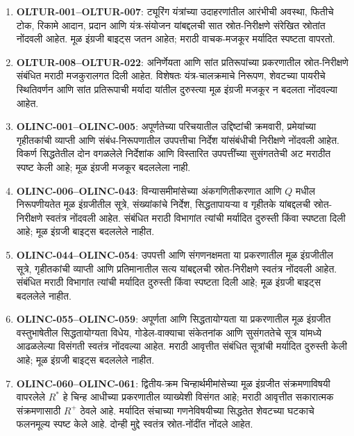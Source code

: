 \begin{enumerate}
\item \textbf{OLTUR-001--OLTUR-007}: ट्यूरिंग यंत्रांच्या उदाहरणांतील
आरंभीची अवस्था, फितीचे टोक, रिकामे आदान, प्रदान आणि यंत्र-संयोजन
यांबद्दलची सात स्रोत-निरीक्षणे संरेखित स्रोतांत नोंदवली आहेत. मूळ
इंग्रजी बाइट्स जतन आहेत; मराठी वाचक-मजकूर मर्यादित स्पष्टता वापरतो.

\item \textbf{OLTUR-008--OLTUR-022}: अनिर्णेयता आणि सांत प्रतिरूपांच्या
प्रकरणातील स्रोत-निरीक्षणे संबंधित मराठी मजकुरालगत दिली आहेत. विशेषतः
यंत्र-चालक्रमाचे निरूपण, शेवटच्या पायरीचे स्थितिवर्णन आणि सांत प्रतिरूपाची
मर्यादा यांतील दुरुस्त्या मूळ इंग्रजी मजकूर न बदलता नोंदवल्या आहेत.

\item \textbf{OLINC-001--OLINC-005}: अपूर्णतेच्या परिचयातील उद्दिष्टांची
क्रमवारी, प्रमेयांच्या गृहीतकांची व्याप्ती आणि संबंध-निरूपणातील उपपत्तीचा
निर्देश यांसंबंधीची निरीक्षणे नोंदवली आहेत. विकर्ण सिद्धतेतील दोन
वगळलेले निर्देशांक आणि विस्तारित उपपत्तींच्या सुसंगततेची अट मराठीत
स्पष्ट केली आहे; मूळ इंग्रजी मजकूर बदललेला नाही.

\item \textbf{OLINC-006--OLINC-043}: विन्यासमीमांसेच्या
अंकगणितीकरणात आणि $Q$ मधील निरूपणीयतेत मूळ इंग्रजीतील
सूत्रे, संख्यांकांचे निर्देश, सिद्धतापायऱ्या व गृहीतके
यांबद्दलची स्रोत-निरीक्षणे स्वतंत्र नोंदवली आहेत.
संबंधित मराठी विभागांत त्यांची मर्यादित दुरुस्ती
किंवा स्पष्टता दिली आहे; मूळ इंग्रजी बाइट्स बदललेले नाहीत.

\item \textbf{OLINC-044--OLINC-054}: उपपत्ती आणि संगणनक्षमता या
प्रकरणातील मूळ इंग्रजीतील सूत्रे, गृहीतकांची व्याप्ती आणि
प्रतिमानातील सत्य यांबद्दलची स्रोत-निरीक्षणे स्वतंत्र नोंदवली
आहेत. संबंधित मराठी विभागांत त्यांची मर्यादित दुरुस्ती
किंवा स्पष्टता दिली आहे; मूळ इंग्रजी बाइट्स बदललेले नाहीत.

\item \textbf{OLINC-055--OLINC-059}: अपूर्णता आणि सिद्धतायोग्यता
या प्रकरणातील मूळ इंग्रजीत वस्तुभाषेतील सिद्धतायोग्यता
विधेय, गोडेल-वाक्याचा संकेतनांक आणि सुसंगततेचे सूत्र
यांमध्ये आढळलेल्या विसंगती स्वतंत्र नोंदवल्या आहेत.
मराठी आवृत्तीत संबंधित सूत्रांची मर्यादित दुरुस्ती
केली आहे; मूळ इंग्रजी बाइट्स बदललेले नाहीत.

\item \textbf{OLINC-060--OLINC-061}: द्वितीय-क्रम चिन्हार्थमीमांसेच्या
मूळ इंग्रजीत संक्रमणाविषयी वापरलेले $R^*$ हे चिन्ह आधीच्या प्रकरणातील
व्याख्येशी विसंगत आहे; मराठी आवृत्तीत सकारात्मक संक्रमणासाठी $R^+$
ठेवले आहे. मर्यादित संचाच्या गणनेविषयीच्या सिद्धतेत शेवटच्या घटकाचे
फलनमूल्य स्पष्ट केले आहे. दोन्ही मुद्दे स्वतंत्र स्रोत-नोंदींत नोंदले आहेत.


\end{enumerate}
